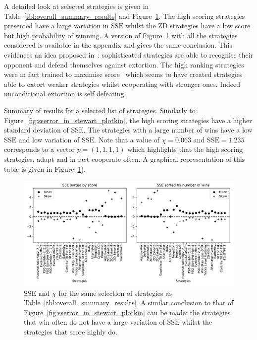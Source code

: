 \documentclass[a4paper]{article}
\newcommand{\SSe}{\text{SSE}}
\begin{document}
A detailed look at selected strategies is given in
Table~\ref{tbl:overall_summary_results} and
Figure~\ref{fig:sserror_in_selection}. The high scoring strategies presented
have a large variation in \(\SSe\) whilst the ZD strategies have a low score but
high probability of winning. A version of Figure~\ref{fig:sserror_in_selection}
with all the strategies considered is available in the appendix and gives the
same conclusion. This evidences an idea proposed
in~\cite{adami2013evolutionary}: sophisticated strategies are able to recognise
their opponent and defend themselves against extortion.  The high ranking
strategies were in fact trained to maximise score~\cite{Harper2017} which seems
to have created strategies able to extort weaker strategies whilst cooperating
with stronger ones. Indeed unconditional extortion is self defeating.

\begin{table}[!hbtp]
    \begin{center}
    \tiny
    
    \end{center}
    \caption{Summary of results for a selected list of strategies. Similarly to
        Figure~\ref{fig:sserror_in_stewart_plotkin}, the high scoring strategies
        have a higher standard deviation of \(\SSe\). The strategies with a
        large number of wins have a low \(\SSe\) and low variation of
        \(\SSe\). Note that a value of \(\chi=0.063\) and \(\SSe=1.235\)
        corresponds to a vector \(p=(1,1,1,1)\) which highlights that the high
        scoring strategies, adapt and in fact cooperate often. A graphical
        representation of this table is given in
        Figure~\ref{fig:sserror_in_selection}).}
    \label{tbl:overall_summary_results}
\end{table}

\begin{figure}[!htbp]
    \centering
    \includegraphics[width=.8\textwidth]{./assets/img/sserror_in_selection/main.pdf}
    \caption{\(\SSe\) and \(\chi\) for the same selection of strategies as
        Table~\ref{tbl:overall_summary_results}. A similar conclusion to that of
        Figure~\ref{fig:sserror_in_stewart_plotkin} can be made: the strategies
        that win often do not have a large variation of \(\SSe\) whilst the
        strategies that score highly do.}
    \label{fig:sserror_in_selection}
\end{figure}
\end{document}
